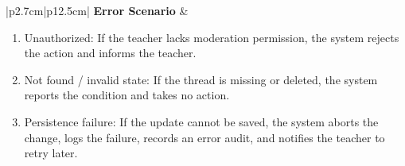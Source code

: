 \begin{table}[H]
\begin{tabular}{|p{2.7cm}|p{12.5cm}|}
        \textbf{Error Scenario} &
        \begin{minipage}[t]{\linewidth}
        \begin{enumerate}[topsep=0pt,itemsep=1pt,parsep=0pt,partopsep=0pt]
            \item Unauthorized: If the teacher lacks moderation permission, the system rejects the action and informs the teacher.
            \item Not found / invalid state: If the thread is missing or deleted, the system reports the condition and takes no action.
            \item Persistence failure: If the update cannot be saved, the system aborts the change, logs the failure, records an error audit, and notifies the teacher to retry later.
        \end{enumerate}
        \end{minipage}
        \\ \hline
    \end{tabular}
    \label{tab:teacher-pin-unpin-thread}
\end{table}

